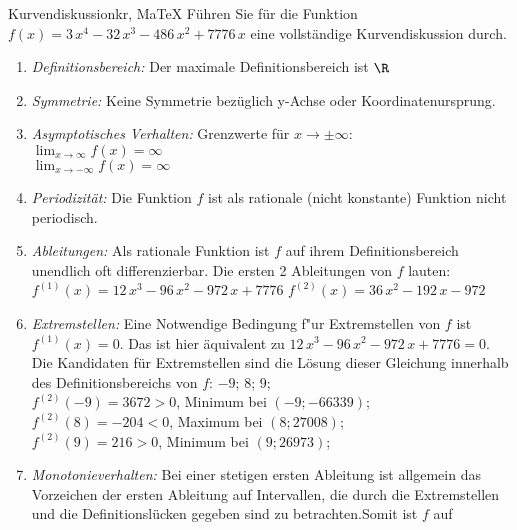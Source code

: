  \providecommand{\MoIl}{(} 
 \providecommand{\MoIr}{)}
 \providecommand{\MIntvlSep}{;} 
 \providecommand{\MElSetSep}{;} 
 \begin{MAufgabe}{Kurvendiskussion}{kr, MaTeX}
 F\"uhren Sie f\"ur die Funktion $f(x)=3\, x^4 - 32\, x^3 - 486\, x^2 + 7776\, x$ eine vollst\"andige Kurvendiskussion durch.\\ 
 \ifLsg\Loesung
 \begin{enumerate}
 \item \emph{Definitionsbereich:} 
 Der maximale Definitionsbereich ist $\R$\item \emph{Symmetrie:} 
 Keine Symmetrie bez\"uglich y-Achse oder Koordinatenursprung.\item \emph{Asymptotisches Verhalten:} 
 Grenzwerte f\"ur $x\rightarrow \pm \infty$: \\ 
 $\lim_{x\rightarrow \infty} f(x)=\infty$ \\ 
 $\lim_{x\rightarrow -\infty} f(x)=\infty$ \\ 
 \item \emph{Periodizit\"at:} 
 Die Funktion $f$ ist als rationale (nicht konstante) Funktion nicht periodisch.\item \emph{Ableitungen:} 
 Als rationale Funktion ist $f$ auf ihrem Definitionsbereich unendlich oft differenzierbar. 
 Die ersten 2 Ableitungen von $f$ lauten: \\ 
 $f^{(1)}(x)=12\, x^3 - 96\, x^2 - 972\, x + 7776$\newline 
  $f^{(2)}(x)=36\, x^2 - 192\, x - 972$\newline 
  \item \emph{Extremstellen:} 
 Eine Notwendige Bedingung f"ur Extremstellen von $f$ ist $f^{(1)}(x)=0$. 
 Das ist hier \"aquivalent zu $12\, x^3 - 96\, x^2 - 972\, x + 7776=0$. 
 Die Kandidaten f\"ur Extremstellen sind die L\"osung dieser Gleichung innerhalb des Definitionsbereichs von $f$: $-9$; $8$; $9$; \\ 
 $f^{(2)}(-9)=3672$$>0$, Minimum bei $(-9;-66339)$; \\ 
 $f^{(2)}(8)=-204$$<0$, Maximum bei $(8;27008)$; \\ 
 $f^{(2)}(9)=216$$>0$, Minimum bei $(9;26973)$; \\ 
 \item \emph{Monotonieverhalten:} 
 Bei einer stetigen ersten Ableitung ist allgemein das Vorzeichen der ersten Ableitung auf Intervallen, die durch die Extremstellen und die Definitionsl\"ucken gegeben sind zu betrachten.Somit ist $f$ auf \\ 
$$
\end{enumerate}
\end{MAufgabe}
